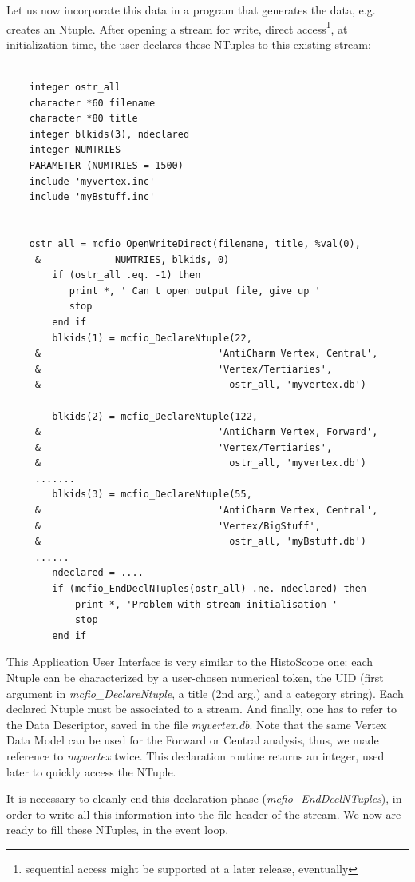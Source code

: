 	Let us now incorporate this data in a program that generates the data,
e.g. creates an Ntuple.  After opening a stream for write, direct
access\footnote{sequential access might be supported at a later release,
eventually}, at initialization time,  the user declares these NTuples to this
existing stream:
\begin{verbatim}

	integer ostr_all
	character *60 filename
	character *80 title
	integer blkids(3), ndeclared
	integer NUMTRIES
	PARAMETER (NUMTRIES = 1500)
	include 'myvertex.inc'
	include 'myBstuff.inc'


	ostr_all = mcfio_OpenWriteDirect(filename, title, %val(0),
     &             NUMTRIES, blkids, 0)
        if (ostr_all .eq. -1) then
           print *, ' Can t open output file, give up '
           stop
        end if
        blkids(1) = mcfio_DeclareNtuple(22,
     &                               'AntiCharm Vertex, Central',
     &                               'Vertex/Tertiaries',
     &                                 ostr_all, 'myvertex.db')

        blkids(2) = mcfio_DeclareNtuple(122,
     &                               'AntiCharm Vertex, Forward',
     &                               'Vertex/Tertiaries',
     &                                 ostr_all, 'myvertex.db')
     .......
        blkids(3) = mcfio_DeclareNtuple(55,
     &                               'AntiCharm Vertex, Central',
     &                               'Vertex/BigStuff',
     &                                 ostr_all, 'myBstuff.db')
     ......
        ndeclared = ....
        if (mcfio_EndDeclNTuples(ostr_all) .ne. ndeclared) then
            print *, 'Problem with stream initialisation '
            stop
        end if

\end{verbatim}

This Application User Interface is very similar to the HistoScope  one: each
Ntuple can be characterized by a user-chosen numerical token, the  UID (first
argument in {\em mcfio\_DeclareNtuple}, a title (2nd arg.) and a  category
string).  Each declared Ntuple must be associated to a stream.  And finally, one
has to refer to the Data Descriptor, saved in the file  {\em myvertex.db}.  Note
that the same Vertex Data Model can be used for the Forward or Central
analysis, thus, we made reference to {\em myvertex} twice. This declaration
routine returns an integer, used later to quickly access the NTuple.

	It is necessary to cleanly end this declaration phase
({\em mcfio\_EndDeclNTuples}), in order to write all this information into
the file header of the stream. We now are ready to fill these NTuples, in
the event loop.

